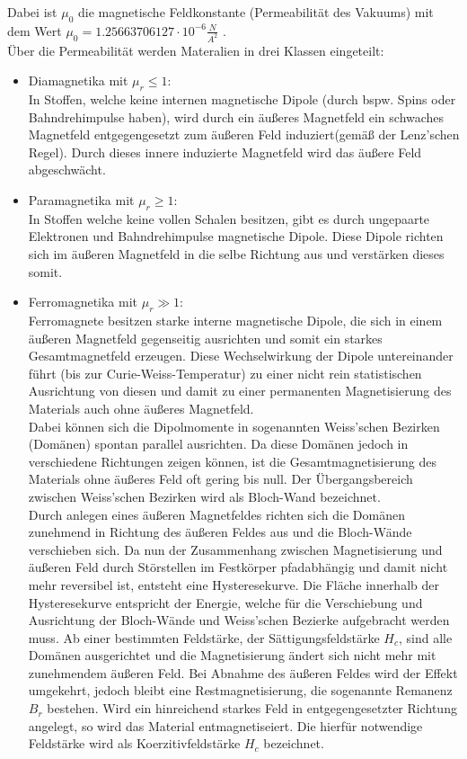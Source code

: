 Dabei ist $\mu_0$ die magnetische Feldkonstante (Permeabilität des Vakuums) mit dem Wert
$\mu_0 = 1.25663706127 \cdot 10^{-6} \frac{N}{A^2}$ \cite{VacuumPerm}.\\
Über die Permeabilität werden Materalien in drei Klassen eingeteilt:
\begin{itemize}
    \item Diamagnetika mit $\mu_r \leq 1$: \\
    In Stoffen, welche keine internen magnetische Dipole (durch bspw. Spins oder Bahndrehimpulse haben),
    wird durch ein äußeres Magnetfeld ein schwaches Magnetfeld entgegengesetzt zum äußeren Feld induziert(gemäß der Lenz'schen Regel).
    Durch dieses innere induzierte Magnetfeld wird das äußere Feld abgeschwächt.
    \item Paramagnetika mit $\mu_r \geq 1$:\\
    In Stoffen welche keine vollen Schalen besitzen, gibt es durch ungepaarte Elektronen und Bahndrehimpulse magnetische Dipole.
    Diese Dipole richten sich im äußeren Magnetfeld in die selbe Richtung aus und verstärken dieses somit.
    \item Ferromagnetika mit $\mu_r \gg 1$:\\
    Ferromagnete besitzen starke interne magnetische Dipole, die sich in einem äußeren Magnetfeld gegenseitig ausrichten und somit ein starkes Gesamtmagnetfeld erzeugen.
    Diese Wechselwirkung der Dipole untereinander führt (bis zur Curie-Weiss-Temperatur) zu einer nicht rein statistischen Ausrichtung
    von diesen und damit zu einer permanenten Magnetisierung des Materials auch ohne äußeres Magnetfeld. \\
    Dabei können sich die Dipolmomente in sogenannten Weiss'schen Bezirken (Domänen) spontan parallel ausrichten. Da diese Domänen
    jedoch in verschiedene Richtungen zeigen können, ist die Gesamtmagnetisierung des Materials ohne äußeres Feld oft gering bis null.
    Der Übergangsbereich zwischen Weiss'schen Bezirken wird als Bloch-Wand bezeichnet. \\
    Durch anlegen eines äußeren Magnetfeldes richten sich die Domänen zunehmend in Richtung des äußeren Feldes aus und die Bloch-Wände
    verschieben sich. Da nun der Zusammenhang zwischen Magnetisierung und äußeren Feld durch Störstellen im Festkörper pfadabhängig und damit nicht mehr reversibel ist, entsteht eine Hysteresekurve.
    Die Fläche innerhalb der Hysteresekurve entspricht der Energie, welche für die Verschiebung und Ausrichtung der Bloch-Wände und Weiss'schen Bezierke aufgebracht werden muss.
    Ab einer bestimmten Feldstärke, der Sättigungsfeldstärke $H_c$, sind alle Domänen ausgerichtet und die Magnetisierung ändert sich nicht mehr mit zunehmendem äußeren Feld.
    Bei Abnahme des äußeren Feldes wird der Effekt umgekehrt, jedoch bleibt eine Restmagnetisierung, die sogenannte Remanenz $B_r$ bestehen.
    Wird ein hinreichend starkes Feld in entgegengesetzter Richtung angelegt, so wird das Material entmagnetiseiert. Die hierfür notwendige Feldstärke wird als Koerzitivfeldstärke $H_c$ bezeichnet. 

\end{itemize}
